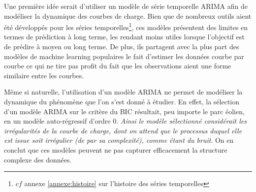 Une première idée serait d'utiliser un modèle de série temporelle ARIMA afin de modéliser la dynamique des courbes de charge. Bien que de nombreux outils aient été développés pour les séries temporelles\footnote{$cf$ annexe \ref{annexe:histoire} sur l'histoire des séries temporelles}, ces modèles présentent des limites en termes de prédiction à long terme, les rendant moins utiles lorsque l'objectif est de prédire à moyen ou long terme. De plus, ils partagent avec la plus part des modèles de machine learning populaires le fait d'estimer les données courbe par courbe ce qui ne tire pas profit du fait que les observations aient une forme similaire entre les courbes.

\smallskip
% 

Même si naturelle, l'utilisation d'un modèle ARIMA ne permet de modéliser la dynamique du phénomène que l'on s'est donné à étudier. En effet, la sélection d'un modèle ARIMA sur le critère du BIC résultait, peu importe le parc éolien, en un modèle auto-régressif d'ordre 0. \emph{Ainsi le modèle sélectionné considérait les irrégularités de la courbe de charge, dont on attend que le processus duquel elle est issue soit irrégulier (de par sa complexité), comme étant du bruit}. On en conclut que ces modèles peuvent ne pas capturer efficacement la structure complexe des données.

\bigskip

\noindent
{}
